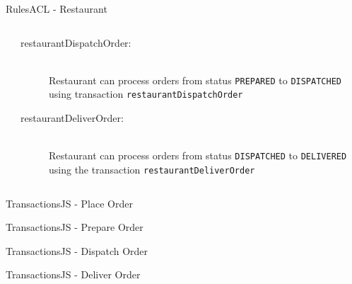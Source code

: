 \documentclass[pdf,table]{beamer}
\begin{document}
\begin{frame}{Rules}{ACL - Restaurant}
	\begin{columns}[T]
		\begin{column}{0.40\textwidth}
			
		\end{column}
		\begin{column}{0.55\textwidth}
		\begin{description}
			\item[restaurantDispatchOrder:] \hfill \\ Restaurant can process orders from status {\tt PREPARED} to {\tt DISPATCHED} using transaction {\tt restaurantDispatchOrder}
			\item[restaurantDeliverOrder:] \hfill \\ Restaurant can process orders from status {\tt DISPATCHED} to {\tt DELIVERED} using the transaction {\tt restaurantDeliverOrder}
		\end{description}	
	\end{column}
	\end{columns}	
\end{frame}

\begin{frame}{Transactions}{JS - Place Order}
	
\end{frame}

\begin{frame}{Transactions}{JS - Prepare Order}
	
\end{frame}

\begin{frame}{Transactions}{JS - Dispatch Order}
	
\end{frame}

\begin{frame}{Transactions}{JS - Deliver Order}
	
\end{frame}





%	
\end{document}

